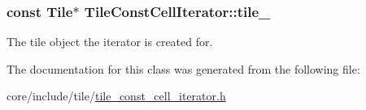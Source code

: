 \subsubsection[{tile\+\_\+}]{\setlength{\rightskip}{0pt plus 5cm}const {\bf Tile}$\ast$ Tile\+Const\+Cell\+Iterator\+::tile\+\_\+\hspace{0.3cm}{\ttfamily [private]}}\label{classTileConstCellIterator_a38199eb8498859e5d2450054291516ad}
The tile object the iterator is created for. 

The documentation for this class was generated from the following file\+:\begin{DoxyCompactItemize}
\item 
core/include/tile/\hyperlink{tile__const__cell__iterator_8h}{tile\+\_\+const\+\_\+cell\+\_\+iterator.\+h}\end{DoxyCompactItemize}

